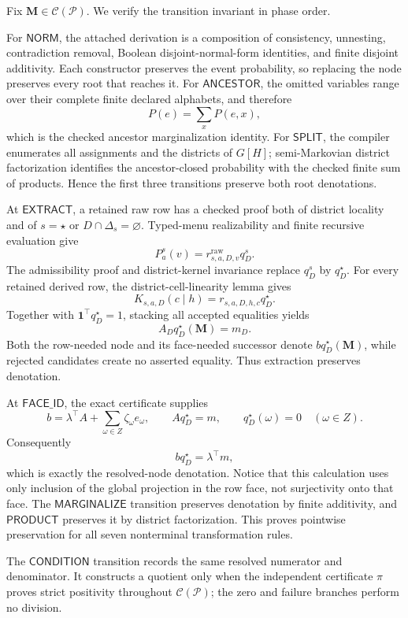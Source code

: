Fix \(\mathbf M\in\mathcal C(\mathcal P)\). We verify the transition invariant in phase order.

For \(\mathsf{NORM}\), the attached derivation is a composition of consistency, unnesting, contradiction removal, Boolean disjoint-normal-form identities, and finite disjoint additivity. Each constructor preserves the event probability, so replacing the node preserves every root that reaches it. For \(\mathsf{ANCESTOR}\), the omitted variables range over their complete finite declared alphabets, and therefore
\[
P(e)=\sum_xP(e,x),
\]
which is the checked ancestor marginalization identity. For \(\mathsf{SPLIT}\), the compiler enumerates all assignments and the districts of \(G[H]\); semi-Markovian district factorization identifies the ancestor-closed probability with the checked finite sum of products. Hence the first three transitions preserve both root denotations.

At \(\mathsf{EXTRACT}\), a retained raw row has a checked proof both of district locality and of \(s=\star\) or \(D\cap\Delta_s=\varnothing\). Typed-menu realizability and finite recursive evaluation give
\[
P_a^s(v)=r^{\mathrm{raw}}_{s,a,D,v}q_D^s.
\]
The admissibility proof and district-kernel invariance replace \(q_D^s\) by \(q_D^\star\). For every retained derived row, the district-cell-linearity lemma gives
\[
K_{s,a,D}(c\mid h)=r_{s,a,D,h,c}q_D^\star.
\]
Together with \(\mathbf 1^\top q_D^\star=1\), stacking all accepted equalities yields
\[
A_Dq_D^\star(\mathbf M)=m_D.
\]
Both the row-needed node and its face-needed successor denote \(bq_D^\star(\mathbf M)\), while rejected candidates create no asserted equality. Thus extraction preserves denotation.

At \(\mathsf{FACE\_ID}\), the exact certificate supplies
\[
b=\lambda^\top A+\sum_{\omega\in Z}\zeta_\omega e_\omega,
\qquad Aq_D^\star=m,
\qquad q_D^\star(\omega)=0\quad(\omega\in Z).
\]
Consequently
\[
bq_D^\star=\lambda^\top m,
\]
which is exactly the resolved-node denotation. Notice that this calculation uses only inclusion of the global projection in the row face, not surjectivity onto that face. The \(\mathsf{MARGINALIZE}\) transition preserves denotation by finite additivity, and \(\mathsf{PRODUCT}\) preserves it by district factorization. This proves pointwise preservation for all seven nonterminal transformation rules.

The \(\mathsf{CONDITION}\) transition records the same resolved numerator and denominator. It constructs a quotient only when the independent certificate \(\pi\) proves strict positivity throughout \(\mathcal C(\mathcal P)\); the zero and failure branches perform no division.

